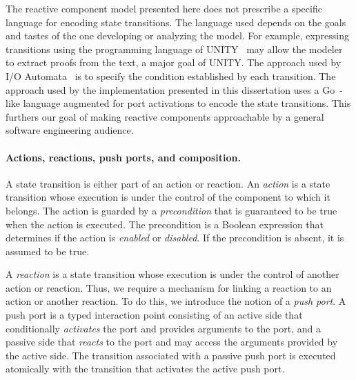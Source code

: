 The reactive component model presented here does not prescribe a specific language for encoding state transitions.
The language used depends on the goals and tastes of the one developing or analyzing the model.
For example, expressing transitions using the programming language of UNITY~\cite{chandy1989parallel} may allow the modeler to extract proofs from the text, a major goal of UNITY.
The approach used by I/O Automata~\cite{nancy1996distributed} is to specify the condition established by each transition.
The approach used by the implementation presented in this dissertation uses a Go~\cite{go}-like language augmented for port activations to encode the state transitions.
This furthers our goal of making reactive components approachable by a general software engineering audience.

\paragraph{Actions, reactions, push ports, and composition.}
A state transition is either part of an action or reaction.
An \emph{action} is a state transition whose execution is under the control of the component to which it belongs.
The action is guarded by a \emph{precondition} that is guaranteed to be true when the action is executed.
The precondition is a Boolean expression that determines if the action is \emph{enabled} or \emph{disabled}.
If the precondition is absent, it is assumed to be true.

A \emph{reaction} is a state transition whose execution is under the control of another action or reaction.
Thus, we require a mechanism for linking a reaction to an action or another reaction.
To do this, we introduce the notion of a \emph{push port}.
A push port is a typed interaction point consisting of an active side that conditionally \emph{activates} the port and provides arguments to the port, and a passive side that \emph{reacts} to the port and may access the arguments provided by the active side.
The transition associated with a passive push port is executed atomically with the transition that activates the active push port.

